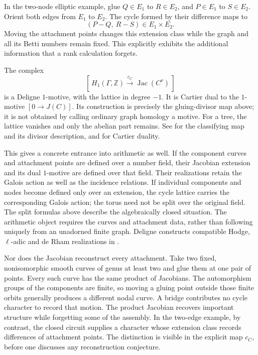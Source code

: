 \documentclass[11pt]{article}
\theoremstyle{definition}
\theoremstyle{remark}
\newcommand{\Z}{\mathbb Z}
\begin{document}
In the two-node elliptic example, glue $Q\in E_1$ to $R\in E_2$, and
$P\in E_1$ to $S\in E_2$.  Orient both edges from $E_1$ to $E_2$.
The cycle formed by their difference maps to
\[
  (P-Q,\ R-S)\in E_1\times E_2.
\]
Moving the attachment points changes this extension class while the graph
and all its Betti numbers remain fixed.  This explicitly exhibits the
additional information that a rank calculation forgets.

The complex
\[
  [\,H_1(\Gamma,\Z)\xrightarrow{c_C}
       \operatorname{Jac}(C^\nu)\,]
\]
is a Deligne $1$-motive, with the lattice in degree $-1$.  It is Cartier
dual to the $1$-motive $[0\to J(C)]$.  Its construction is precisely the
gluing-divisor map above; it is not obtained by calling ordinary graph
homology a motive.  For a tree, the lattice vanishes and only the abelian
part remains.  See \cite[\S3.1.1]{CaporasoVivianiStableTorelli} for the
classifying map and its divisor description, and
\cite[\S10.2.11--10.2.13]{DeligneHodgeIII} for Cartier duality.

This gives a concrete entrance into arithmetic as well.  If the component
curves and attachment points are defined over a number field, their
Jacobian extension and its dual $1$-motive are defined over that field.
Their realizations retain the Galois action as well as the incidence
relations.  If individual components and nodes become defined only over
an extension, the cycle lattice carries the corresponding Galois action;
the torus need not be split over the original field.  The split formulas
above describe the algebraically closed situation.  The arithmetic object
requires the curves and attachment data, rather than following uniquely
from an unadorned finite graph.  Deligne constructs compatible Hodge,
$\ell$-adic and de Rham realizations in \cite[\S10.3]{DeligneHodgeIII}.

Nor does the Jacobian reconstruct every attachment.  Take two fixed,
nonisomorphic smooth curves of genus at least two and glue them at one
pair of points.  Every such curve has the same product of Jacobians.
The automorphism groups of the components are finite, so moving a gluing
point outside those finite orbits generally produces a different nodal
curve.  A bridge contributes no cycle character to record that motion.
The product Jacobian recovers important structure while forgetting some
of the assembly.  In the two-edge example, by contrast, the closed
circuit supplies a character whose extension class records differences
of attachment points.  The distinction is visible in the explicit map
$c_C$, before one discusses any reconstruction conjecture.
\end{document}
